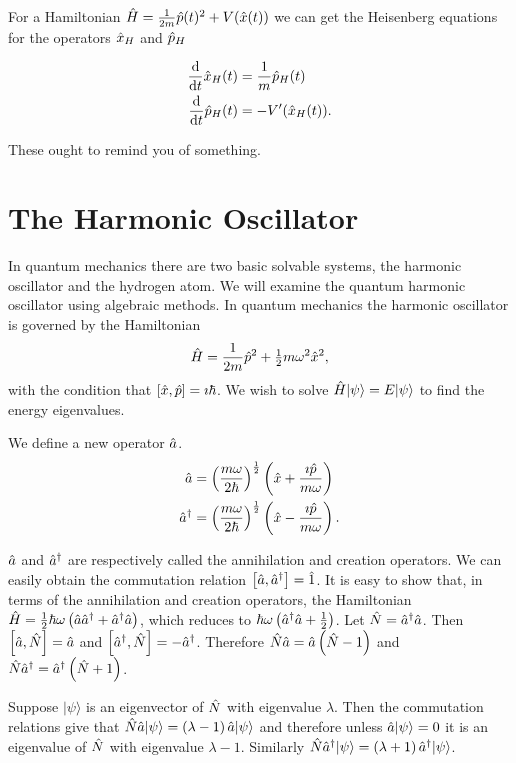 \documentclass{notes}
\newcommand{\ket}[1]{|#1\rangle}
\newcommand{\com}[2]{\left[#1,#2\right]}
\begin{document}
For a Hamiltonian $\Hat{H} = \frac{1}{2 m} \Hat{p}(t)^2 + V(\Hat{x}(t))$
we can get the Heisenberg equations for the operators $\Hat{x}_H$ and
$\Hat{p}_H$

\begin{align*}
\frac{\mathrm{d}}{\mathrm{d} t} \Hat{x}_H(t) &= \frac{1}{m} \Hat{p}_H(t) \\
\frac{\mathrm{d}}{\mathrm{d} t} \Hat{p}_H(t) &= - V'(\Hat{x}_H(t)).
\end{align*}

These ought to remind you of something.

\chapter{The Harmonic Oscillator}

In quantum mechanics there are two basic solvable systems, the harmonic
oscillator and the hydrogen atom.  We will examine the quantum harmonic
oscillator using algebraic methods.  In quantum mechanics the harmonic
oscillator is governed by the Hamiltonian
\[
\Hat{H} = \frac{1}{2 m}\Hat{p}^2 + \tfrac{1}{2} m \omega^2 \Hat{x}^2,
\]
with the condition that $\com{\Hat{x}}{\Hat{p}} = \imath \hbar$.  We
wish to solve $\Hat{H} \ket{\psi} = E \ket{\psi}$ to find the energy
eigenvalues.

We define a new operator $\Hat{a}$.
\begin{align*}
\Hat{a} &= \left( \frac{m \omega}{2 \hbar}
\right)^{\frac{1}{2}} \left( \Hat{x} + \frac{\imath \Hat{p}}{m \omega}
\right)\\
\Hat{a}^\dag &= \left( \frac{m \omega}{2 \hbar}
\right)^{\frac{1}{2}} \left( \Hat{x} - \frac{\imath \Hat{p}}{m \omega} \right).
\end{align*}

$\Hat{a}$ and $\Hat{a}^\dag$ are respectively called the annihilation and
creation operators.  We can easily obtain the commutation relation
$\com{\Hat{a}}{\Hat{a}^\dag} = \Hat{1}$.  It is easy to show that, in
terms of the annihilation and creation operators, the Hamiltonian
$\Hat{H} = \frac{1}{2} \hbar \omega \left( \Hat{a} \Hat{a}^\dag
+ \Hat{a}^\dag \Hat{a}\right)$, which reduces to $\hbar \omega
\left( \Hat{a}^\dag \Hat{a} + \frac{1}{2} \right)$.  Let $\Hat{N}
= \Hat{a}^\dag \Hat{a}$.  Then $\com{\Hat{a}}{\Hat{N}} = \Hat{a}$ and
$\com{\Hat{a}^\dag}{\Hat{N}} = -\Hat{a}^\dag$.  Therefore
$\Hat{N} \Hat{a} = \Hat{a} \left( \Hat{N} - 1 \right)$ and
$\Hat{N} \Hat{a}^\dag = \Hat{a}^\dag \left( \Hat{N} + 1 \right)$.

Suppose $\ket{\psi}$ is an eigenvector of $\Hat{N}$ with eigenvalue
$\lambda$.  Then the commutation relations give that $\Hat{N} \Hat{a}
\ket{\psi} = \left( \lambda - 1 \right) \Hat{a} \ket{\psi}$ and
therefore unless $\Hat{a} \ket{\psi} = 0$ it is an eigenvalue of
$\Hat{N}$ with eigenvalue $\lambda-1$.  Similarly $\Hat{N}
\Hat{a}^\dag \ket{\psi} = \left( \lambda +1 \right) \Hat{a}^\dag
\ket{\psi}$.
\end{document}
